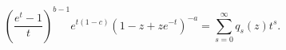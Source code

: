 \[\left(\frac{e^{t}-1}{t}\right)^{b-1}e^{t(1-c)}\left(1-z+ze^{-t}\right)^{-a}=%
\sum_{s=0}^{\infty}q_{s}(z)t^{s}.\]